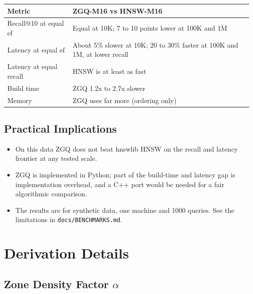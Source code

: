 \documentclass[11pt,a4paper]{article}
\newcommand{\ef}{\text{ef}}
\begin{document}
\begin{tcolorbox}[title=Measured result (2026-11-08), colback=blue!5]
\begin{center}
\begin{tabular}{lp{7.5cm}}
\textbf{Metric} & \textbf{ZGQ-M16 vs HNSW-M16} \\
\hline
Recall@10 at equal $\ef$ & Equal at 10K; 7 to 10 points lower at 100K and 1M \\
Latency at equal $\ef$ & About 5\% slower at 10K; 20 to 30\% faster at 100K and 1M, at lower recall \\
Latency at equal recall & HNSW is at least as fast \\
Build time & ZGQ 1.2x to 2.7x slower \\
Memory & ZGQ uses far more (ordering only) \\
\end{tabular}
\end{center}
\end{tcolorbox}

\subsection{Practical Implications}

\begin{itemize}
    \item On this data ZGQ does not beat hnswlib HNSW on the recall and latency frontier at any tested scale.
    \item ZGQ is implemented in Python; part of the build-time and latency gap is implementation overhead, and a C++ port would be needed for a fair algorithmic comparison.
    \item The results are for synthetic data, one machine and 1000 queries. See the limitations in \texttt{docs/BENCHMARKS.md}.
\end{itemize}

\appendix
\section{Derivation Details}

\subsection{Zone Density Factor $\alpha$}
\end{document}

